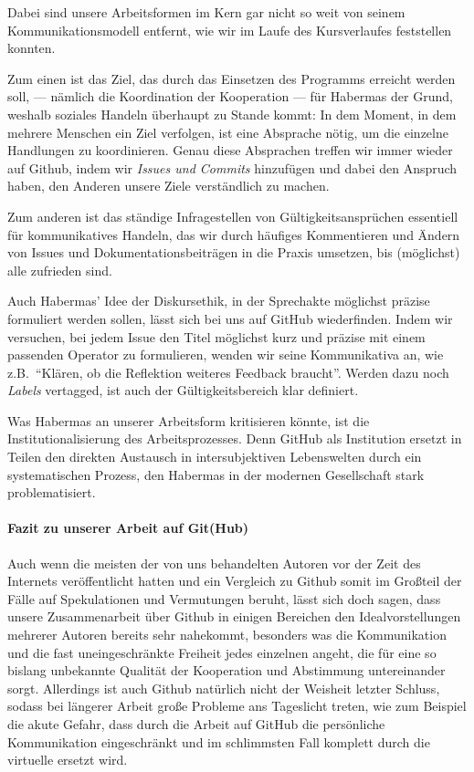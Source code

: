 Dabei sind unsere Arbeitsformen im Kern gar nicht so weit von seinem Kommunikationsmodell entfernt, wie wir im Laufe des Kursverlaufes feststellen konnten.

Zum einen ist das Ziel, das durch das Einsetzen des Programms erreicht werden soll, --- nämlich die Koordination der Kooperation --- für Habermas der Grund, weshalb soziales Handeln überhaupt zu Stande kommt:
In dem Moment, in dem mehrere Menschen ein Ziel verfolgen, ist eine Absprache nötig, um die einzelne Handlungen zu koordinieren.
Genau diese Absprachen treffen wir immer wieder auf Github, indem wir \emph{Issues und Commits} hinzufügen und dabei den Anspruch haben, den Anderen unsere Ziele verständlich zu machen.

Zum anderen ist das ständige Infragestellen von Gültigkeitsansprüchen essentiell für kommunikatives Handeln, das wir durch häufiges Kommentieren und Ändern von Issues und Dokumentationsbeiträgen in die Praxis umsetzen, bis (möglichst) alle zufrieden sind.

Auch Habermas' Idee der Diskursethik, in der Sprechakte möglichst präzise formuliert werden sollen, lässt sich bei uns auf GitHub wiederfinden.
Indem wir versuchen, bei jedem Issue den Titel möglichst kurz und präzise mit einem passenden Operator zu formulieren, wenden wir seine Kommunikativa an, wie z.B.\ ``Klären, ob die Reflektion weiteres Feedback braucht''.
Werden dazu noch \emph{Labels} vertagged, ist auch der Gültigkeitsbereich klar definiert.

Was Habermas an unserer Arbeitsform kritisieren könnte, ist die Institutionalisierung des Arbeitsprozesses.
Denn GitHub als Institution ersetzt in Teilen den direkten Austausch in intersubjektiven Lebenswelten durch ein systematischen Prozess, den Habermas in der modernen Gesellschaft stark problematisiert.


\paragraph{Fazit zu unserer Arbeit auf Git(Hub)}

Auch wenn die meisten der von uns behandelten Autoren vor der Zeit des Internets veröffentlicht hatten und ein Vergleich zu Github somit im Großteil der Fälle auf Spekulationen und Vermutungen beruht, lässt sich doch sagen, dass unsere Zusammenarbeit über Github in einigen Bereichen den Idealvorstellungen mehrerer Autoren bereits sehr nahekommt, besonders was die Kommunikation und die fast uneingeschränkte Freiheit jedes einzelnen angeht, die für eine so bislang unbekannte Qualität der Kooperation und Abstimmung untereinander sorgt.
Allerdings ist auch Github natürlich nicht der Weisheit letzter Schluss, sodass bei längerer Arbeit große Probleme ans Tageslicht treten, wie zum Beispiel die akute Gefahr, dass durch die Arbeit auf GitHub die persönliche Kommunikation eingeschränkt und im schlimmsten Fall komplett durch die virtuelle ersetzt wird.
